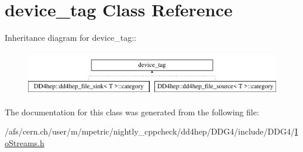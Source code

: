\hypertarget{classboost_1_1iostreams_1_1device__tag}{
\section{device\_\-tag Class Reference}
\label{classboost_1_1iostreams_1_1device__tag}
}
Inheritance diagram for device\_\-tag::\begin{figure}[H]
\begin{center}
\leavevmode
\includegraphics[height=2cm]{classboost_1_1iostreams_1_1device__tag}
\end{center}
\end{figure}


The documentation for this class was generated from the following file:\begin{DoxyCompactItemize}
\item 
/afs/cern.ch/user/m/mpetric/nightly\_\-cppcheck/dd4hep/DDG4/include/DDG4/\hyperlink{_io_streams_8h}{IoStreams.h}\end{DoxyCompactItemize}
